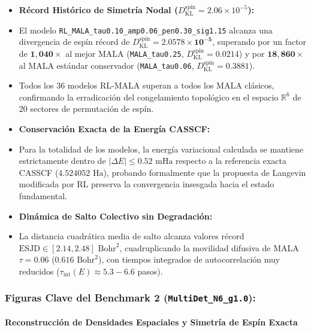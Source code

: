 \documentclass[10pt,a4paper]{article}
\begin{document}
\begin{itemize}
\item \textbf{Récord Histórico de Simetría Nodal ($D_{\mathrm{KL}}^{\mathrm{spin}} = 2.06 \times 10^{-5}$):}
\item El modelo \texttt{RL\_MALA\_tau0.10\_amp0.06\_pen0.30\_sig1.15} alcanza una divergencia de espín récord de \textbf{$D_{\mathrm{KL}}^{\mathrm{spin}} = \mathbf{2.0578 \times 10^{-5}}$}, superando por un factor de \textbf{$\mathbf{1,040\times}$} al mejor MALA (\texttt{MALA\_tau0.25}, $D_{\mathrm{KL}}^{\mathrm{spin}} = 0.0214$) y por \textbf{$\mathbf{18,860\times}$} al MALA estándar conservador (\texttt{MALA\_tau0.06}, $D_{\mathrm{KL}}^{\mathrm{spin}} = 0.3881$).
\item Todos los 36 modelos RL-MALA superan a todos los MALA clásicos, confirmando la erradicación del congelamiento topológico en el espacio $\mathbb{R}^6$ de 20 sectores de permutación de espín.
\item \textbf{Conservación Exacta de la Energía CASSCF:}
\item Para la totalidad de los modelos, la energía variacional calculada se mantiene estrictamente dentro de $|\Delta E| \le 0.52\text{ mHa}$ respecto a la referencia exacta CASSCF ($4.524052\text{ Ha}$), probando formalmente que la propuesta de Langevin modificada por RL preserva la convergencia insesgada hacia el estado fundamental.
\item \textbf{Dinámica de Salto Colectivo sin Degradación:}
\item La distancia cuadrática media de salto alcanza valores récord $\mathrm{ESJD} \in [2.14, 2.48]\text{ Bohr}^2$, cuadruplicando la movilidad difusiva de MALA $\tau=0.06$ ($0.616\text{ Bohr}^2$), con tiempos integrados de autocorrelación muy reducidos ($\tau_{\mathrm{int}}(E) \approx 5.3 - 6.6$ pasos).
\end{itemize}




\subsubsection{Figuras Clave del Benchmark 2 (\texttt{MultiDet\_N6\_g1.0}):}




\paragraph{Reconstrucción de Densidades Espaciales y Simetría de Espín Exacta}
\end{document}
